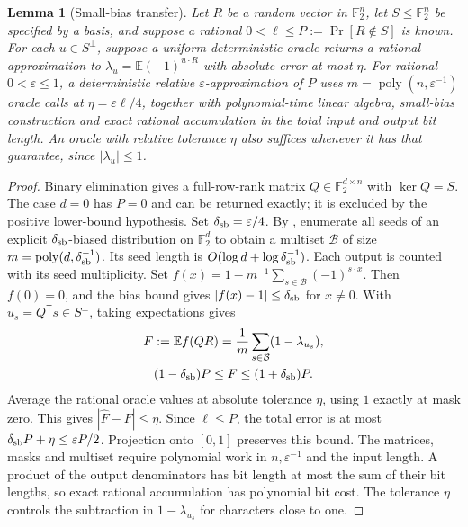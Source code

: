 \documentclass[10pt,twocolumn]{article}
\newtheorem{lemma}[theorem]{Lemma}
\theoremstyle{definition}
\newcommand{\Ftwo}{\mathbb{F}_2}
\DeclareMathOperator{\poly}{poly}
\begin{document}
\begin{lemma}[Small-bias transfer]\label{lem:small-bias-transfer}
Let $R$ be a random vector in $\Ftwo^n$, let $S\le\Ftwo^n$ be specified
by a basis, and suppose a rational $0<\ell\le P:=\Pr[R\notin S]$ is known.
For each $u\in S^\perp$, suppose a uniform deterministic oracle returns
a rational approximation to $\lambda_u=\mathbb E(-1)^{u\cdot R}$ with
absolute error at most $\eta$.
For rational $0<\varepsilon\le1$, a deterministic relative
$\varepsilon$-approximation of $P$ uses
$m=\poly(n,\varepsilon^{-1})$ oracle calls at
$\eta=\varepsilon\ell/4$, together with polynomial-time linear algebra,
small-bias construction and exact rational accumulation in the total
input and output bit length.
An oracle with relative tolerance $\eta$ also suffices whenever it has
that guarantee, since $|\lambda_u|\le1$.
\end{lemma}
\begin{proof}
Binary elimination gives a full-row-rank matrix $Q\in\Ftwo^{d\times n}$
with $\ker Q=S$. The case $d=0$ has $P=0$ and can be returned exactly;
it is excluded by the positive lower-bound hypothesis.
Set $\delta_{\rm sb}=\varepsilon/4$.
By \cite[Thm.~3.2 and Sec.~3.3]{NN93}, enumerate all seeds of an explicit
$\delta_{\rm sb}$-biased distribution on $\Ftwo^d$ to obtain a
multiset $\mathcal B$ of size $m=\poly(d,\delta_{\rm sb}^{-1})$.
Its seed length is $O(\log d+\log\delta_{\rm sb}^{-1})$. Each output
is counted with its seed multiplicity.
Set $f(x)=1-m^{-1}\sum_{s\in\mathcal B}(-1)^{s\cdot x}$.
Then $f(0)=0$, and the bias bound gives
$|f(x)-1|\le\delta_{\rm sb}$ for $x\ne0$.
With $u_s=Q^{\mathsf T}s\in S^\perp$, taking expectations gives
\begin{equation}\label{eq:small-bias-test}
\begin{gathered}
 F:=\mathbb E f(QR)=\frac1m\sum_{s\in\mathcal B}(1-\lambda_{u_s}),
 \\ (1-\delta_{\rm sb})P\le F\le(1+\delta_{\rm sb})P.
\end{gathered}
\end{equation}
Average the rational oracle values at absolute tolerance $\eta$,
using $1$ exactly at mask zero. This gives $|\widehat F-F|\le\eta$.
Since $\ell\le P$, the total error is at most
$\delta_{\rm sb}P+\eta\le\varepsilon P/2$. Projection onto $[0,1]$
preserves this bound.
The matrices, masks and multiset require polynomial work in
$n,\varepsilon^{-1}$ and the input length. A product of the output
denominators has bit length at most the sum of their bit lengths, so
exact rational accumulation has polynomial bit cost. The tolerance
$\eta$ controls the subtraction in $1-\lambda_{u_s}$ for characters close to one.
\end{proof}
\end{document}
